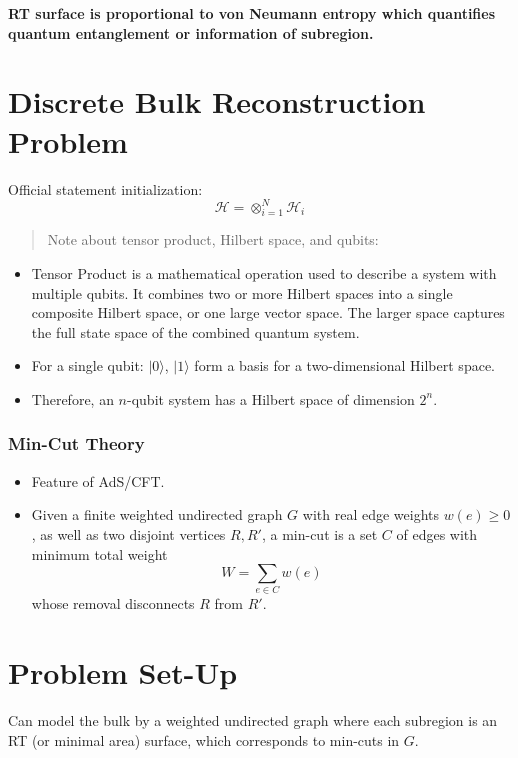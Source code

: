 \documentclass{article}
\begin{document}
\textbf{RT surface is proportional to von Neumann entropy which quantifies quantum entanglement or information of subregion.}

\section{Discrete Bulk Reconstruction Problem}
Official statement initialization:
\[
\mathcal{H} = \otimes^{N}_{i=1}\mathcal{H}_{i}
\]
\begin{quote}
    Note about tensor product, Hilbert space, and qubits:
\end{quote}
\begin{itemize}
    \item Tensor Product is a mathematical operation used to describe a system with multiple qubits. It combines two or more Hilbert spaces into a single composite Hilbert space, or one large vector space. The larger space captures the full state space of the combined quantum system.
    \item For a single qubit: $|0\rangle$, $|1\rangle$ form a basis for a two-dimensional Hilbert space.
    \item Therefore, an $n$-qubit system has a Hilbert space of dimension $2^n$.
\end{itemize}

\subsubsection*{Min-Cut Theory}
\begin{itemize}
    \item Feature of AdS/CFT.
    \item Given a finite weighted undirected graph \( G \) with real edge weights \( w(e) \geq 0 \), as well as two disjoint vertices \( R, R' \), a min-cut is a set \( C \) of edges with minimum total weight
    \[
    W = \sum_{e \in C} w(e)
    \]
    whose removal disconnects \( R \) from \( R' \).
\end{itemize}

\section{Problem Set-Up}
Can model the bulk by a weighted undirected graph where each subregion is an RT (or minimal area) surface, which corresponds to min-cuts in \( G \).
\end{document}
